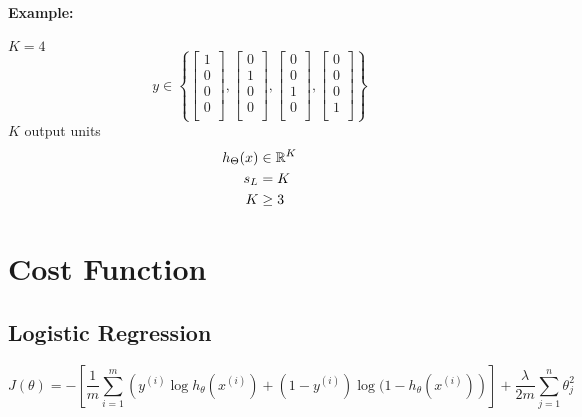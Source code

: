\paragraph{Example:} $K = 4$
\begin{equation*}
	y \in \left\{
	\begin{bmatrix}
		1 \\
		0 \\
		0 \\
		0 \\
	\end{bmatrix}, \begin{bmatrix}
		0 \\
		1 \\
		0 \\
		0 \\
	\end{bmatrix}, \begin{bmatrix}
		0 \\
		0 \\
		1 \\
		0 \\
	\end{bmatrix}, \begin{bmatrix}
		0 \\
		0 \\
		0 \\
		1 \\
	\end{bmatrix}
	\right\}
\end{equation*}
$K$ output units
\begin{align*}
	h_\Theta(x) & \in \mathbb{R}^K \\
	s_L         & = K      \\
	K           & \ge 3    \\
\end{align*}


\section{Cost Function}
\subsection*{Logistic Regression}
\begin{equation*}
	J(\theta) = -\left[
		\frac{1}{m}\sum_{i=1}^m\left(
		y^{(i)}\log h_\theta(x^{(i)}) +
		(1 - y^{(i)})\log(1 - h_\theta(x^{(i)})
		\right)
		\right] + \frac{\lambda}{2m}\sum_{j=1}^n\theta_j^2
\end{equation*}
